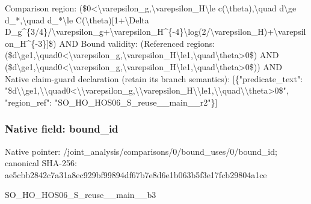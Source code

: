 \documentclass[10pt,a4paper]{article}
\begin{document}
\begingroup\raggedright\sloppy Comparison region:\allowbreak{} (\$0<\textbackslash{}varepsilon\_\allowbreak{}g,\allowbreak{}\textbackslash{}varepsilon\_\allowbreak{}H\textbackslash{}le c(\textbackslash{}theta),\allowbreak{}\textbackslash{}quad d\textbackslash{}ge d\_\allowbreak{}*,\allowbreak{}\textbackslash{}quad d\_\allowbreak{}*\textbackslash{}le C(\textbackslash{}theta)[1+\textbackslash{}Delta D\_\allowbreak{}g\textasciicircum{}\{3/\allowbreak{}4\}/\allowbreak{}\textbackslash{}varepsilon\_\allowbreak{}g+\textbackslash{}varepsilon\_\allowbreak{}H\textasciicircum{}\{-4\}\textbackslash{}log(2/\allowbreak{}\textbackslash{}varepsilon\_\allowbreak{}H)+\textbackslash{}varepsilon\_\allowbreak{}H\textasciicircum{}\{-3\}]\$) AND Bound validity:\allowbreak{} (Referenced regions:\allowbreak{} (\$d\textbackslash{}ge1,\allowbreak{}\textbackslash{}quad0<\textbackslash{}varepsilon\_\allowbreak{}g,\allowbreak{}\textbackslash{}varepsilon\_\allowbreak{}H\textbackslash{}le1,\allowbreak{}\textbackslash{}quad\textbackslash{}theta>0\$) AND (\$d\textbackslash{}ge1,\allowbreak{}\textbackslash{}quad0<\textbackslash{}varepsilon\_\allowbreak{}g,\allowbreak{}\textbackslash{}varepsilon\_\allowbreak{}H\textbackslash{}le1,\allowbreak{}\textbackslash{}quad\textbackslash{}theta>0\$)) AND Native claim-guard declaration (retain its branch semantics):\allowbreak{} [\{"predicate\_\allowbreak{}text":\allowbreak{} "\$d\textbackslash{}\textbackslash{}ge1,\allowbreak{}\textbackslash{}\textbackslash{}quad0<\textbackslash{}\textbackslash{}varepsilon\_\allowbreak{}g,\allowbreak{}\textbackslash{}\textbackslash{}varepsilon\_\allowbreak{}H\textbackslash{}\textbackslash{}le1,\allowbreak{}\textbackslash{}\textbackslash{}quad\textbackslash{}\textbackslash{}theta>0\$",\allowbreak{} "region\_\allowbreak{}ref":\allowbreak{} "SO\_\allowbreak{}HO\_\allowbreak{}HOS06\_\allowbreak{}S\_\allowbreak{}reuse\_\allowbreak{}\_\allowbreak{}main\_\allowbreak{}\_\allowbreak{}r2"\}]\par\endgroup

\subsubsection{Native field: bound\_\allowbreak{}id}
Native pointer: /joint\_\allowbreak{}analysis/comparisons/0/bound\_\allowbreak{}uses/0/bound\_\allowbreak{}id; canonical SHA-256: ae5cbb2842c7a31a8ec929bf99894df67b7e8d6e1b063b5f3e17fcb29804a1ce

\begingroup\raggedright\sloppy SO\_\allowbreak{}HO\_\allowbreak{}HOS06\_\allowbreak{}S\_\allowbreak{}reuse\_\allowbreak{}\_\allowbreak{}main\_\allowbreak{}\_\allowbreak{}b3\par\endgroup
\end{document}
